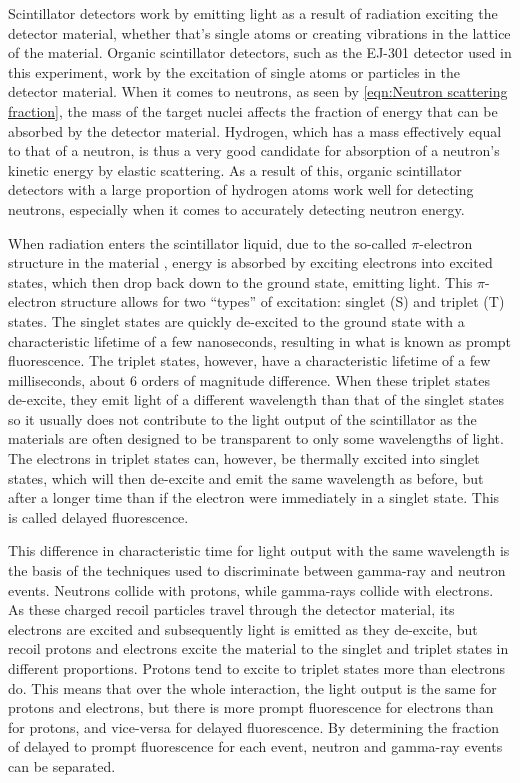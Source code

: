 \documentclass[11pt]{article}
\numberwithin{equation}{section}
\numberwithin{figure}{section}
\numberwithin{table}{section}
\begin{document}
\par Scintillator detectors work by emitting light as a result of radiation exciting the detector material, whether that's single atoms or creating vibrations in the lattice of the material. Organic scintillator detectors, such as the EJ-301 detector used in this experiment, work by the excitation of single atoms or particles in the detector material. When it comes to neutrons, as seen by \cref{eqn:Neutron scattering fraction}, the mass of the target nuclei affects the fraction of energy that can be absorbed by the detector material. Hydrogen, which has a mass effectively equal to that of a neutron, is thus a very good candidate for absorption of a neutron's kinetic energy by elastic scattering. As a result of this, organic scintillator detectors with a large proportion of hydrogen atoms work well for detecting neutrons, especially when it comes to accurately detecting neutron energy.
\newline
\par When radiation enters the scintillator liquid, due to the so-called $\pi$-electron structure in the material \cite{Knoll}, energy is absorbed by exciting electrons into excited states, which then drop back down to the ground state, emitting light. This $\pi$-electron structure allows for two ``types'' of excitation: singlet (S) and triplet (T) states. The singlet states are quickly de-excited to the ground state with a characteristic lifetime of a few nanoseconds, resulting in what is known as prompt fluorescence. The triplet states, however, have a characteristic lifetime of a few milliseconds, about 6 orders of magnitude difference. When these triplet states de-excite, they emit light of a different wavelength than that of the singlet states so it usually does not contribute to the light output of the scintillator as the materials are often designed to be transparent to only some wavelengths of light. The electrons in triplet states can, however, be thermally excited into singlet states, which will then de-excite and emit the same wavelength as before, but after a longer time than if the electron were immediately in a singlet state. This is called delayed fluorescence.
\par This difference in characteristic time for light output with the same wavelength is the basis of the techniques used to discriminate between gamma-ray and neutron events. Neutrons collide with protons, while gamma-rays collide with electrons. As these charged recoil particles travel through the detector material, its electrons are excited and subsequently light is emitted as they de-excite, but recoil protons and electrons excite the material to the singlet and triplet states in different proportions. Protons tend to excite to triplet states more than electrons do. This means that over the whole interaction, the light output is the same for protons and electrons, but there is more prompt fluorescence for electrons than for protons, and vice-versa for delayed fluorescence. By determining the fraction of delayed to prompt fluorescence for each event, neutron and gamma-ray events can be separated.
\end{document}
